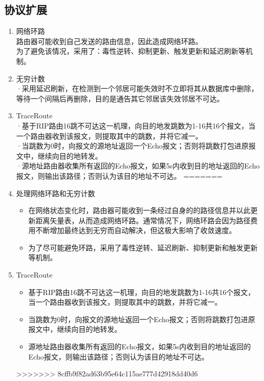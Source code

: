 	\subsection{协议扩展} %
	\label{sub:协议扩展}
		\begin{enumerate}
<<<<<<< HEAD
			\item 网络环路\\
				路由器可能收到自己发送的路由信息，因此造成网络环路。\\
				为了避免该情况，采用了：毒性逆转、抑制更新、触发更新和延迟刷新等机制。
			\item 无穷计数\\
				·采用延迟刷新，在检测到一个邻居可能失效时不立即将其从数据库中删除，等待一个间隔后再删除，目的是通告其它邻居该失效邻居不可达。
			\item TraceRoute\\
				·基于RIP路由16跳不可达这一机理，向目的地发跳数为1-16共16个报文，当一个路由器收到该报文，则提取其中的跳数，并将它减一。\\
				·当跳数为0时，向报文的源地址返回一个Echo报文；否则将跳数打包进原报文中，继续向目的地转发。\\
				·源地址路由器收集所有返回的Echo报文，如果5s内收到目的地址返回的Echo报文，则输出该路径；否则认为该目的地址不可达。
=======
			\item 处理网络环路和无穷计数
				\begin{itemize}
					\item 在网络状态变化时，路由器可能收到一条经过自身的的路径信息并以此更新距离矢量表，从而造成网络环路。通常情况下，网络环路会因为路径费用不断增加最终达到无穷而自动解决，但这极大影响了收敛速度。
					\item 为了尽可能避免环路，采用了毒性逆转、延迟刷新、抑制更新和触发更新等机制。
				\end{itemize}
			\item TraceRoute
				\begin{itemize}
					\item 基于RIP路由16跳不可达这一机理，向目的地发跳数为1-16共16个报文，当一个路由器收到该报文，则提取其中的跳数，并将它减一。
					\item 当跳数为0时，向报文的源地址返回一个Echo报文；否则将跳数打包进原报文中，继续向目的地转发。
					\item 源地址路由器收集所有返回的Echo报文，如果5s内收到目的地址返回的Echo报文，则输出该路径；否则认为该目的地址不可达。
				\end{itemize}
>>>>>>> 8cffb9f82ad63b95e64c115ae777d42918dd40d6
		\end{enumerate}
